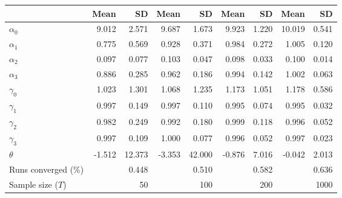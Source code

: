 
\begin{tabular}[t]{lrrrrrrrr}
\toprule
  & Mean & SD & Mean  & SD  & Mean   & SD   & Mean    & SD   \\
\midrule
$\alpha_{0}$ & 9.012 & 2.571 & 9.687 & 1.673 & 9.923 & 1.220 & 10.019 & 0.541\\
$\alpha_{1}$ & 0.775 & 0.569 & 0.928 & 0.371 & 0.984 & 0.272 & 1.005 & 0.120\\
$\alpha_{2}$ & 0.097 & 0.077 & 0.103 & 0.047 & 0.098 & 0.033 & 0.100 & 0.014\\
$\alpha_{3}$ & 0.886 & 0.285 & 0.962 & 0.186 & 0.994 & 0.142 & 1.002 & 0.063\\
$\gamma_{0}$ & 1.023 & 1.301 & 1.068 & 1.235 & 1.173 & 1.051 & 1.178 & 0.586\\
$\gamma_{1}$ & 0.997 & 0.149 & 0.997 & 0.110 & 0.995 & 0.074 & 0.995 & 0.032\\
$\gamma_{2}$ & 0.982 & 0.249 & 0.992 & 0.180 & 0.999 & 0.118 & 0.996 & 0.052\\
$\gamma_{3}$ & 0.997 & 0.109 & 1.000 & 0.077 & 0.996 & 0.052 & 0.997 & 0.023\\
$\theta$ & -1.512 & 12.373 & -3.353 & 42.000 & -0.876 & 7.016 & -0.042 & 2.013\\
Runs converged (\%) &  & 0.448 &  & 0.510 &  & 0.582 &  & 0.636\\
Sample size ($T$) &  & 50 &  & 100 &  & 200 &  & 1000\\
\bottomrule
\end{tabular}
